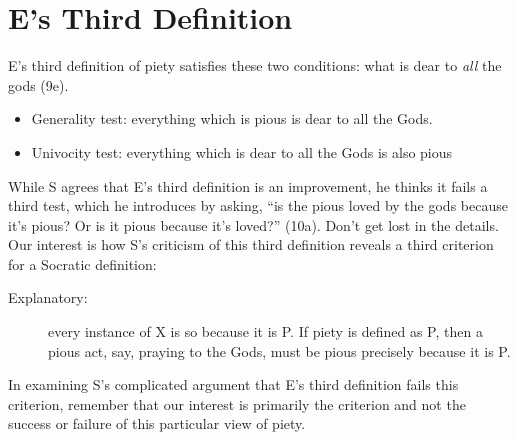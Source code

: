 \documentclass[oneside]{article}
\begin{document}







\section*{E's Third Definition}

E's third definition of piety satisfies these two conditions: what is dear to \emph{all} the gods (9e). 
\begin{itemize} 
\item Generality test:  everything which is pious is dear to all the Gods. 
\item Univocity test: everything which is dear to all the Gods is also pious
\end{itemize}
While S agrees that E's third definition is an improvement, he thinks it fails a third test, which he introduces by asking, ``is the pious loved by the gods because it's pious? Or is it pious because it's loved?'' (10a). Don't get lost in the details. Our interest is how S's criticism of this third definition reveals a third criterion for a Socratic definition: 
\begin{description} 
\item[Explanatory:]  every instance of X is so because it is P. If piety is defined as P, then a pious act, say, praying to the Gods, must be pious precisely because it is P. 
\end{description}
In examining S's complicated argument that E's third definition fails this criterion, remember that our interest is primarily the criterion and not the success or failure of this particular view of piety. 
\end{document}

